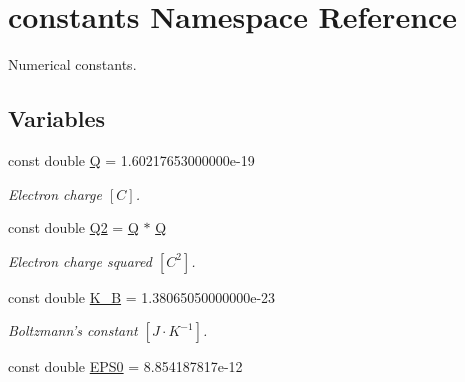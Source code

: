 \hypertarget{namespaceconstants}{\section{constants Namespace Reference}
\label{namespaceconstants}
}


Numerical constants.  


\subsection*{Variables}
\begin{DoxyCompactItemize}
\item 
\hypertarget{namespaceconstants_a4a1828262ad1758b7ba69747f653b3b5}{const double \hyperlink{namespaceconstants_a4a1828262ad1758b7ba69747f653b3b5}{Q} = 1.\-60217653000000e-\/19}\label{namespaceconstants_a4a1828262ad1758b7ba69747f653b3b5}

\begin{DoxyCompactList}\small\item\em Electron charge $ \left[ C \right] $. \end{DoxyCompactList}\item 
\hypertarget{namespaceconstants_a58f4d8c535a1a29924ab9895ac5e3027}{const double \hyperlink{namespaceconstants_a58f4d8c535a1a29924ab9895ac5e3027}{Q2} = \hyperlink{namespaceconstants_a4a1828262ad1758b7ba69747f653b3b5}{Q} $\ast$ \hyperlink{namespaceconstants_a4a1828262ad1758b7ba69747f653b3b5}{Q}}\label{namespaceconstants_a58f4d8c535a1a29924ab9895ac5e3027}

\begin{DoxyCompactList}\small\item\em Electron charge squared $ \left[ C^2 \right] $. \end{DoxyCompactList}\item 
\hypertarget{namespaceconstants_a00c952dfd5e516e8aed05892039e2723}{const double \hyperlink{namespaceconstants_a00c952dfd5e516e8aed05892039e2723}{K\-\_\-\-B} = 1.\-38065050000000e-\/23}\label{namespaceconstants_a00c952dfd5e516e8aed05892039e2723}

\begin{DoxyCompactList}\small\item\em Boltzmann's constant $ \left[ J \cdot K^{-1} \right] $. \end{DoxyCompactList}\item 
\hypertarget{namespaceconstants_ade68b010588957aef9890077adb7565f}{const double \hyperlink{namespaceconstants_ade68b010588957aef9890077adb7565f}{E\-P\-S0} = 8.\-854187817e-\/12}\label{namespaceconstants_ade68b010588957aef9890077adb7565f}


\end{DoxyCompactItemize}
